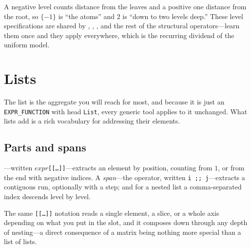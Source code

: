 A negative level counts distance from the leaves and a positive one distance from
the root, so \(\{-1\}\) is ``the atoms'' and \(2\) is ``down to two levels
deep.'' These level specifications are shared by ,
, , and the rest of the structural operators---learn them once
and they apply everywhere, which is the recurring dividend of the uniform model.

\section{Lists}
\label{sec:ds-lists}

The list is the aggregate you will reach for most, and because it is just an
\texttt{EXPR\_FUNCTION} with head \texttt{List}, every generic tool applies to it
unchanged. What lists add is a rich vocabulary for addressing their elements.

\subsection{Parts and spans}
\label{ssec:ds-parts}

---written \(\mathit{expr}\)\texttt{[[\ldots]]}---extracts an element by
position, counting from \(1\), or from the end with negative indices. A
\emph{span}---the  operator, written \texttt{i ;; j}---extracts
a contiguous run, optionally with a step; and for a nested list a comma-separated
index descends level by level.

\begin{codepairs}
\end{codepairs}

The same \texttt{[[\ldots]]} notation reads a single element, a slice, or a whole
axis depending on what you put in the slot, and it composes down through any depth
of nesting---a direct consequence of a matrix being nothing more special than a list
of lists.

